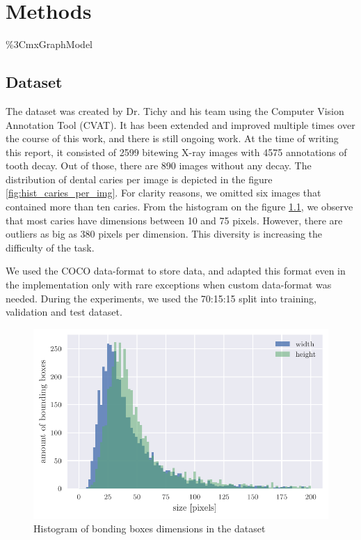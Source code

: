 \chapter{Methods}
\%3CmxGraphModel%
\section{Dataset}
The dataset was created by Dr. Tichy and his team using the Computer Vision Annotation Tool (CVAT). It has been extended and improved multiple times over the course of this work, and there is still ongoing work. At the time of writing this report, it consisted of 2599 bitewing X-ray images with 4575 annotations of tooth decay. Out of those, there are 890 images without any decay. The distribution of dental caries per image is depicted in the figure \ref{fig:hist_caries_per_img}. For clarity reasons, we omitted six images that contained more than ten caries. From the histogram on the figure \ref{fig:hist_caries_dim}, we observe that most caries have dimensions between 10 and 75 pixels. However, there are outliers as big as 380 pixels per dimension. This diversity is increasing the difficulty of the task.

We used the COCO data-format to store data, and adapted this format even in the implementation only with rare exceptions when custom data-format was needed. During the experiments, we used the 70:15:15 split into training, validation and test dataset.
\begin{figure}
    \includegraphics[width = \linewidth]{images/dataset_histogram.pdf}
    \caption{Histogram of bonding boxes dimensions in the dataset}
    \label{fig:hist_caries_dim}
\end{figure}

